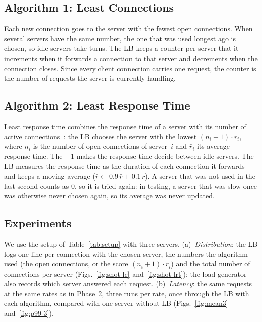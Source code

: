 \subsection{Algorithm 1: Least Connections}
Each new connection goes to the server with the fewest open connections. When
several servers have the same number, the one that was used longest ago is chosen,
so idle servers take turns. The LB keeps a counter per server that it increments when
it forwards a connection to that server and decrements when the connection closes.
Since every client connection carries one request, the counter is the number of
requests the server is currently handling.

\subsection{Algorithm 2: Least Response Time}
Least response time combines the response time of a server with its number of
active connections~\cite{aws_lb}: the LB chooses the server with the lowest
$(n_i+1)\cdot\bar r_i$, where $n_i$ is the number of open connections of server~$i$
and $\bar r_i$ its average response time. The $+1$ makes the response time decide
between idle servers. The LB measures the response time as the duration of each
connection it forwards and keeps a moving average
($\bar r \leftarrow 0.9\,\bar r + 0.1\,r$). A server that was not used in the last
second counts as 0, so it is tried again: in testing, a server that was slow once
was otherwise never chosen again, so its average was never updated.

\subsection{Experiments}
We use the setup of Table~\ref{tab:setup} with three servers. (a)~\emph{Distribution}:
the LB logs one line per connection with the chosen server, the numbers the
algorithm used (the open connections, or the score $(n_i+1)\cdot\bar r_i$) and the total
number of connections per server
(Figs.~\ref{fig:shot-lc} and~\ref{fig:shot-lrt}); the load generator also records
which server answered each request. (b)~\emph{Latency}: the same requests at the same
rates as in Phase~2, three runs per rate, once through the LB with each algorithm,
compared with one server without LB (Figs.~\ref{fig:mean3} and~\ref{fig:p99-3}).

